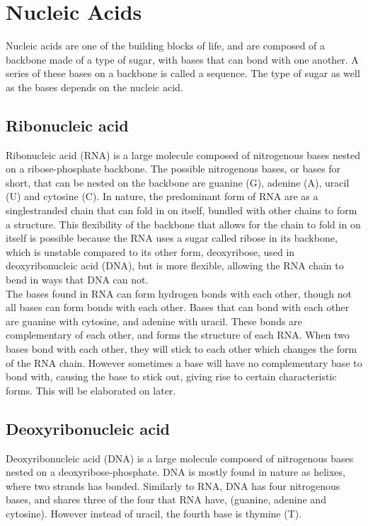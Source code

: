 \section{Nucleic Acids}
Nucleic acids are one of the building blocks of life, and are composed of a 
backbone made of a type of sugar, with bases that can bond with one another. 
A series of these bases on a backbone is called a sequence. The 
type of sugar as well as the bases depends on the nucleic acid. 
\subsection{Ribonucleic acid} %
Ribonucleic acid (RNA) is a large molecule composed of nitrogenous 
bases nested on a ribose-phosphate backbone. The possible nitrogenous bases, or 
bases for short, 
that can be nested on the backbone are guanine (G), adenine (A), uracil (U) and cytosine 
(C). In nature, the predominant form of RNA are as a singlestranded chain 
that can fold in on itself, bundled with other chains to form a structure. 
This flexibility of the backbone that allows for the chain to fold in on itself 
is possible because the RNA uses a sugar called ribose in its backbone, 
which is unstable compared to its other form, deoxyribose, used in 
deoxyribonucleic acid (DNA), but is more flexible, allowing the RNA chain to 
bend in ways that DNA can not.\\

The bases found in RNA can form hydrogen bonds with each other, though not all 
bases can form bonds with each other. Bases that can bond with each other are 
guanine with cytosine, and adenine with uracil. These bonds are complementary 
of each other, and forms the structure of each RNA. When 
two bases bond with each other, they will stick to each other 
which changes the form of the RNA chain. However sometimes a base will have no 
complementary base to bond with, causing the base to stick out, giving rise to 
certain characteristic forms. This will be elaborated on later.

\subsection{Deoxyribonucleic acid}
Deoxyribonucleic acid (DNA) is a large molecule composed of nitrogenous bases 
nested on a deoxyribose-phosphate. DNA is mostly found in nature as helixes, 
where two strands has bonded. Similarly to RNA, DNA has four nitrogenous 
bases, and shares three of the four that RNA have, (guanine, adenine and cytosine). 
However instead of uracil, the fourth base is thymine (T). 

